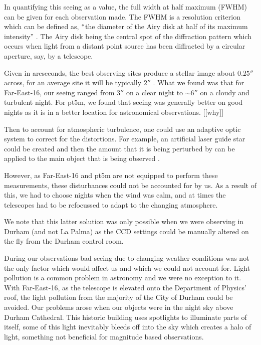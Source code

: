 \documentclass[twocolumn]{revtex4}
\begin{document}
In quantifying this seeing as a value, the full width at half maximum (FWHM) can be given for each observation made. The FWHM is a resolution criterion which can be defined as, $``$the diameter of the Airy disk at half of its maximum intensity'' \cite{princ_stell_inter}. The Airy disk being the central spot of the diffraction pattern which occurs when light from a distant point source has been diffracted by a circular aperture, say, by a telescope. 

Given in arcseconds, the best observing sites produce a stellar image about $0.25''$ across, for an average site it will be typically $2''$ \cite{tel_tech}. What we found was that for Far-East-16, our seeing ranged from $3''$ on a clear night to $\sim6''$ on a cloudy and turbulent night. For pt5m, we found that seeing was generally better on good nights as it is in a better location for astronomical observations. [[why]]

Then to account for atmospheric turbulence, one could use an adaptive optic system to correct for the distortions. For example, an artificial laser guide star could be created and then the amount that it is being perturbed by can be applied to the main object that is being observed \cite{princ_stell_inter}.

However, as Far-East-16 and pt5m are not equipped to perform these measurements, these disturbances could not be accounted for by us. As a result of this, we had to choose nights when the wind was calm, and at times the telescopes had to be refocussed to adapt to the changing atmosphere.

We note that this latter solution was only possible when we were observing in Durham (and not La Palma) as the CCD settings could be manually altered on the fly from the Durham control room.

During our observations bad seeing due to changing weather conditions was not the only factor which would affect us and which we could not account for. Light pollution is a common problem in astronomy and we were no exception to it. With Far-East-16, as the telescope is elevated onto the Department of Physics' roof, the light pollution from the majority of the City of Durham could be avoided. Our problems arose when our objects were in the night sky above Durham Cathedral. This historic building uses spotlights to illuminate parts of itself, some of this light inevitably bleeds off into the sky which creates a halo of light, something not beneficial for magnitude based observations.
\end{document}
